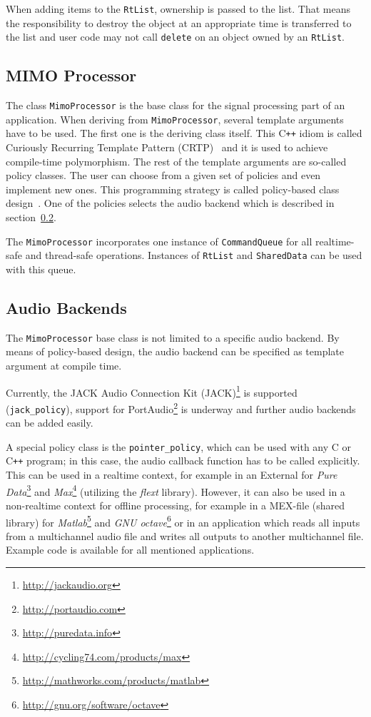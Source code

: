 \documentclass[11pt,letterpaper]{article}
\newcommand{\code}{\texttt}
\begin{document}
When adding items to the \code{RtList}, ownership is passed to the list.
That means the responsibility to destroy the object at an appropriate time is
transferred to the list and user code may not call \code{delete} on an
object owned by an \code{RtList}.

\subsection{MIMO Processor}

The class \code{MimoProcessor} is the base class for the signal processing part of
an application.
When deriving from \code{MimoProcessor}, several template arguments have to be
used.
The first one is the deriving class itself.
This C\texttt{++} idiom is called
Curiously Recurring Template Pattern (CRTP)~\cite{coplien1995crtp} and it is
used to achieve
compile-time polymorphism.
The rest of the template arguments are so-called policy classes. The user can
choose from a given set of policies and even implement new ones.
This programming strategy is called
policy-based class design~\cite{alexandrescu2001modern}.
One of the policies selects the audio backend which is described in
section~\ref{sec:backends}.

The \code{MimoProcessor} incorporates one instance of \code{CommandQueue} for all realtime-safe
and thread-safe operations. Instances of \code{RtList} and \code{SharedData} can
be used with this queue.

\subsection{Audio Backends}

\label{sec:backends}

The \code{MimoProcessor} base class is not limited to a specific audio backend.
By means of policy-based design, the audio backend can be specified as template
argument at compile time.

Currently, the JACK Audio Connection Kit (JACK)\footnote{\url{http://jackaudio.org}}
is supported (\code{jack\string_policy}), 
support for PortAudio\footnote{\url{http://portaudio.com}} is underway and further
audio backends can be added easily.

A special policy class is the \code{pointer\string_policy}, which can be used
with any C or C\texttt{++} program;
in this case, the audio callback function has to be called explicitly.
This can be used in a realtime context, for example in an External for
\emph{Pure Data}\footnote{\url{http://puredata.info}} and
\emph{Max}\footnote{\url{http://cycling74.com/products/max}} (utilizing the
\emph{flext}
library).
However, it can also be used in a non-realtime context for offline processing,
for example in a MEX-file (shared library) for
\emph{Matlab}\footnote{\url{http://mathworks.com/products/matlab}} and \emph{GNU
octave}\footnote{\url{http://gnu.org/software/octave}} or in an
application which reads all inputs from a multichannel audio file and writes all
outputs to another multichannel file.
Example code is available for all mentioned applications.
\end{document}

